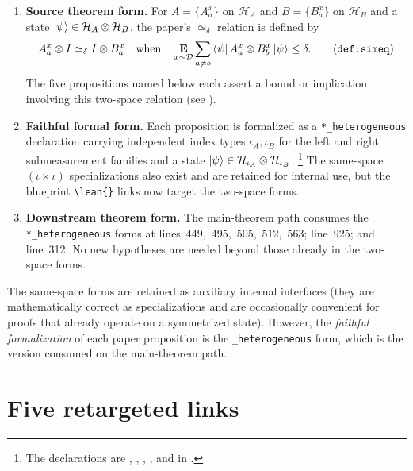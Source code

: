 \documentclass[11pt]{article}
\begin{document}
\begin{enumerate}
  \item \textbf{Source theorem form.}  For \(A=\{A_a^x\}\) on \(\mathcal H_A\)
  and \(B=\{B_a^x\}\) on \(\mathcal H_B\) and a state
  \(\ket{\psi}\in\mathcal H_A\otimes\mathcal H_B\), the paper's
  \(\simeq_\delta\) relation is defined by
  \[
    A_a^x\otimes I \simeq_\delta I\otimes B_a^x
    \quad\text{when}\quad
    \E_{x\sim\mathcal D}\sum_{a\neq b}
    \bra{\psi}A_a^x\otimes B_b^x\ket{\psi}\le\delta .
    \tag{\texttt{def:simeq}}
  \]
  The five propositions named below each assert a bound or implication
  involving this two-space relation (see
  ).

  \item \textbf{Faithful formal form.}  Each proposition is formalized as a
  \verb|*_heterogeneous| declaration carrying independent index types
  \(\iota_A,\iota_B\) for the left and right submeasurement families and a
  state \(\ket{\psi}\in\mathcal H_{\iota_A}\otimes\mathcal H_{\iota_B}\).%
  \footnote{The declarations are ,
  ,
  ,
  , and
   in
  .}
  The same-space \((\iota\times\iota)\) specializations also exist and are
  retained for internal use, but the blueprint \verb|\lean{}| links now target
  the two-space forms.

  \item \textbf{Downstream theorem form.}  The main-theorem path consumes the
  \verb|*_heterogeneous| forms at
  lines~449,~495,~505,~512,~563;
   line~925; and
   line~312.  No new hypotheses are needed beyond those
  already in the two-space forms.
\end{enumerate}

The same-space forms are retained as auxiliary internal interfaces (they are
mathematically correct as specializations and are occasionally convenient for
proofs that already operate on a symmetrized state).  However, the
\emph{faithful formalization} of each paper proposition is the
\verb|_heterogeneous| form, which is the version consumed on the main-theorem
path.

\section{Five retargeted links}
\end{document}
